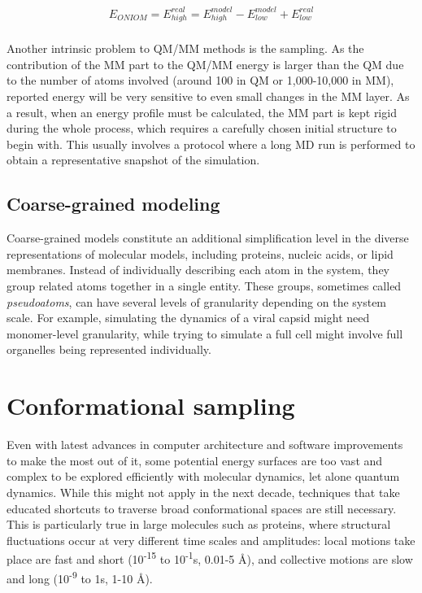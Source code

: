 \begin{align}
  E_{ONIOM}=E_{high}^{real}=E_{high}^{model}-E_{low}^{model}+E_{low}^{real} \\ \tag{ONIOM energy}
\end{align}


Another intrinsic problem to QM/MM methods is the sampling. As the contribution of the MM part to the QM/MM energy is larger than the QM due to the number of atoms involved (around 100 in QM or 1,000-10,000 in MM), reported energy will be very sensitive to even small changes in the MM layer. As a result, when an energy profile must be calculated, the MM part is kept rigid during the whole process, which requires a carefully chosen initial structure to begin with. This usually involves a protocol where a long MD run is performed to obtain a representative snapshot of the simulation.

\subsection{Coarse-grained modeling}

Coarse-grained models constitute an additional simplification level in the diverse representations of molecular models, including proteins,\cite{Kmiecik_2016,Ing_lfsson_2013} nucleic acids,\cite{Boniecki_2015,Potoyan_2012} or lipid membranes.\cite{Baron_2007} Instead of individually describing each atom in the system, they group related atoms together in a single entity. These groups, sometimes called \textit{pseudoatoms}, can have several levels of granularity depending on the system scale. For example, simulating the dynamics of a viral capsid might need monomer-level granularity,\cite{Hagan_2016} while trying to simulate a full cell might involve full organelles being represented individually.\cite{pivkin2008accurate}



\section{Conformational sampling}

Even with latest advances in computer architecture and software improvements to make the most out of it, some potential energy surfaces are too vast and complex to be explored efficiently with molecular dynamics, let alone quantum dynamics. While this might not apply in the next decade, techniques that take educated shortcuts to traverse broad conformational spaces are still necessary. This is particularly true in large molecules such as proteins, where structural fluctuations occur at very different time scales and amplitudes: local motions take place are fast and short (10\textsuperscript{-15} to 10\textsuperscript{-1}s, 0.01-5 \AA), and collective motions are slow and long (10\textsuperscript{-9} to 1s, 1-10 \AA).

